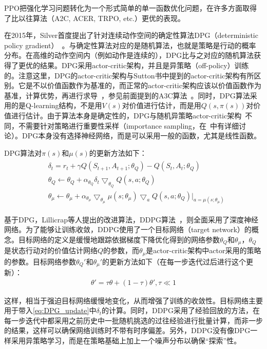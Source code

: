       \par PPO把强化学习问题转化为一个形式简单的单一函数优化问题，在许多方面取得了比以往算法（A2C, ACER, TRPO, etc.）更优的表现。\par
      在2015年，Silver首度提出了针对连续动作空间的确定性算法DPG（deterministic policy gradient）~\cite{DPG}。与确定性算法对应的是随机算法，也就是策略是行动的概率分布。在高维的动作空间内（例如动作是连续的），DPG比与之对应的随机算法获得了更优的结果。DPG采用actor-critic架构，并且是异策略（off-policy）训练的。注意这里，DPG的actor-critic架构与Sutton书中提到的actor-critic架构有所区别。它是不以价值函数作为基准的，而正常的actor-critic架构应该以价值函数作为基准，计算优势，再进行求导~\cite{Sutton_book}，参见前面提到的A3C算法~\cite{A3C}。同时，DPG算法采用的是Q-learning结构，不是用$V(s)$对价值进行估计，而是用$Q(s, \pi(s))$对价值进行估计。由于算法本身是确定性的，DPG与随机异策略actor-critic架构~\cite{off-policy_actor-critic}不同，不需要针对策略进行重要性采样（importance sampling，在~\cite{Sutton_book}中有详细讨论）。DPG本身没有选择神经网络，而是可以采用一般的函数，尤其是线性函数。\par
      DPG算法对$\pi(s)$和$\mu(s)$的更新方法如下：
      \begin{align}
        \begin{aligned}
          &\delta_t = r_t + \gamma Q(S_{t+1}, A_{t+1};\theta_Q) - Q(S_t, A_t;\theta_Q)\\
          &\theta_Q \gets \theta_Q + \alpha_{\theta_Q}\delta_t \bigtriangledown_{\theta_Q}Q(s, a;\theta_Q)\\
          &\theta_\mu \gets \theta_\mu + \alpha_{\theta_\mu}\bigtriangledown_{\theta_\mu}\mu(s;\theta_\mu)\bigtriangledown_{a}Q(s, a;\theta_Q)|_{a = \mu(s;\theta_\mu)}
        \end{aligned}
        \label{eq:DPG_update}
      \end{align}
      \par 基于DPG，Lillicrap等人提出的改进算法，DDPG算法~\cite{DDPG}，则全面采用了深度神经网络。为了能够让训练收敛，DDPG使用了一个目标网络（target network）的概念。目标网络的定义是缓慢地跟踪依据梯度下降优化得到的网络参数$\theta_Q$和$\theta_\mu$，$\theta_Q$是状态行动对的价值估计网络$Q$的参数，而$\theta_\mu$是actor-critic架构中actor采用的策略的参数。目标网络参数$\theta_Q'$和$\theta_\mu'$的更新方法如下（在每一步迭代过后进行这个更新）：
      \begin{align*}
        \theta' = \tau \theta + (1-\tau) \theta', \tau \ll 1
        \label{eq:target_network}
      \end{align*}
      \par 这样，相当于强迫目标网络缓慢地变化，从而增强了训练的收敛性。目标网络主要用于带入\eqref{eq:DPG_update}中$\delta_t$的计算。同时，DDPG采用了经验回放的方法，在每一步迭代中都采用之前历史中一批随机挑选的过往经验进行批量计算，而非一步的结果，这样可以确保网络训练时不带有时序偏差。另外，DDPG没有像DPG一样采用异策略学习，而是在策略基础上加上一个噪声分布以确保``探索''性。\par
      
